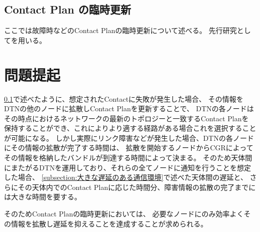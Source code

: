 \subsection{Contact Plan の臨時更新}
\label{sec:ContactPlanの臨時更新}
ここでは故障時などのContact Planの臨時更新について述べる。
先行研究として\cite{Bezirgiannidis2013}を用いる。

\section{問題提起}
\label{sec:ContactPlanの臨時更新の課題}
\ref{sec:ContactPlanの臨時更新}で述べたように、想定されたContactに失敗が発生した場合、
その情報をDTNの他のノードに拡散しContact Planを更新することで、
DTNの各ノードはその時点におけるネットワークの最新のトポロジーと一致するContact Planを
保持することができ、これによりより適する経路がある場合これを選択することが可能になる。
しかし実際にリンク障害などが発生した場合、DTNの各ノードにその情報の拡散が完了する時間は、
拡散を開始するノードからCGRによってその情報を格納したバンドルが到達する時間によって決まる。
そのため天体間にまたがるDTNを運用しており、それらの全てノードに通知を行うことを想定した場合、
\ref{subsection:大きな遅延のある通信環境}で述べた天体間の遅延と、
さらにその天体内でのContact Planに応じた時間分、障害情報の拡散の完了までには大きな時間を要する。

そのためContact Planの臨時更新においては、
必要なノードにのみ効率よくその情報を拡散し遅延を抑えることを達成することが求められる。
